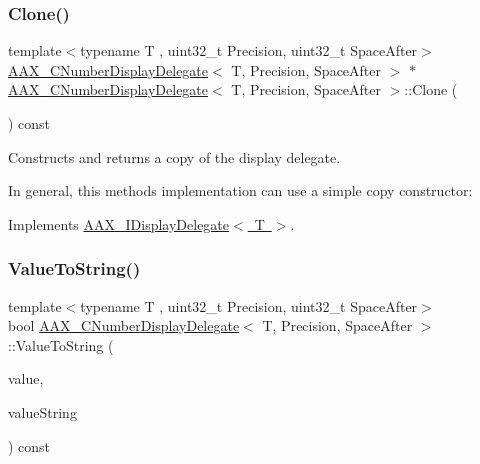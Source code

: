 \subsubsection{\texorpdfstring{Clone()}{Clone()}}
{\footnotesize\ttfamily template$<$typename T , uint32\+\_\+t Precision, uint32\+\_\+t Space\+After$>$ \\
\mbox{\hyperlink{a01509}{A\+A\+X\+\_\+\+C\+Number\+Display\+Delegate}}$<$ T, Precision, Space\+After $>$ $\ast$ \mbox{\hyperlink{a01509}{A\+A\+X\+\_\+\+C\+Number\+Display\+Delegate}}$<$ T, Precision, Space\+After $>$\+::Clone (\begin{DoxyParamCaption}{ }\end{DoxyParamCaption}) const\hspace{0.3cm}{\ttfamily [virtual]}}



Constructs and returns a copy of the display delegate. 

In general, this method\textquotesingle{}s implementation can use a simple copy constructor\+:


\begin{DoxyCode}{0}
\DoxyCodeLine{\textcolor{keyword}{}\{}
\DoxyCodeLine{\}}
\end{DoxyCode}
 

Implements \mbox{\hyperlink{a01801_a138a82c124ddda8255ce39194dfc1f3f}{A\+A\+X\+\_\+\+I\+Display\+Delegate$<$ T $>$}}.

\mbox{\label{a01509_a260439b47a0890a008f7984958e11662}} 
\subsubsection{\texorpdfstring{ValueToString()}{ValueToString()}\hspace{0.1cm}{\footnotesize\ttfamily [1/2]}}
{\footnotesize\ttfamily template$<$typename T , uint32\+\_\+t Precision, uint32\+\_\+t Space\+After$>$ \\
bool \mbox{\hyperlink{a01509}{A\+A\+X\+\_\+\+C\+Number\+Display\+Delegate}}$<$ T, Precision, Space\+After $>$\+::Value\+To\+String (\begin{DoxyParamCaption}\item[{T}]{value,  }\item[{\mbox{\hyperlink{a01573}{A\+A\+X\+\_\+\+C\+String}} $\ast$}]{value\+String }\end{DoxyParamCaption}) const\hspace{0.3cm}{\ttfamily [virtual]}}



